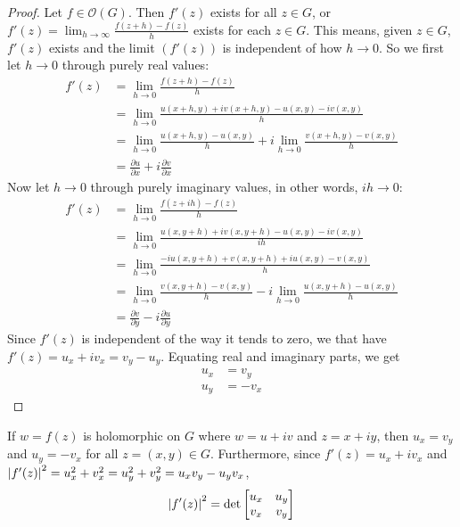 \documentclass[12pt]{article}
\begin{document}
\begin{proof} Let $f \in \mathcal{O}(G)$. Then $f'(z)$ exists for all $ z \in G$, or $f'(z) = \lim_{h\to\infty} \frac{f(z+h) - f(z)}{h}$ exists for each $z \in G$. This means, given $z \in G$, $f'(z)$ exists and the limit $(f'(z))$ is independent of how $h \to 0$. So we first let $h \to 0$ through purely real values: $$ \begin{aligned} 
f'(z) &= \lim_{h\to 0} \frac{f(z+h) - f(z)}{h} \\ &= \lim_{h\to 0} \frac{u(x+h,y) + iv(x+h,y) - u(x,y) - iv(x,y)}{h} \\ &= \lim_{h\to 0} \frac{u(x+h,y) - u(x,y)}{h} + i\lim_{h\to 0} \frac{v(x+h,y) - v(x,y)}{h} \\ &= \frac{\partial u}{\partial x} + i \frac{\partial v}{\partial x} \end{aligned} $$ 
Now let $h \to 0$ through purely imaginary values, in other words, $ih \to 0$: $$ \begin{aligned} f'(z) &= \lim_{h\to 0} \frac{f(z + ih) - f(z)}{h} \\ &= \lim_{h\to 0} \frac{u(x,y+h) + iv(x,y+h) - u(x,y) - iv(x,y)}{ih} \\ &= \lim_{h\to 0} \frac{-iu(x,y+h) + v(x,y+h) + iu(x,y) - v(x,y)}{h} \\ &= \lim_{h\to 0} \frac{v(x,y+h) - v(x,y)}{h} - i\lim_{h\to 0} \frac{u(x,y+h) - u(x,y)}{h} \\ &= \frac{\partial v}{\partial y} -i \frac{\partial u}{\partial y} \end{aligned} $$ 
Since $f'(z)$ is independent of the way it tends to zero, we that have $f'(z) = u_x + iv_x = v_y - u_y$. Equating real and imaginary parts, we get $$ \begin{aligned} u_x &= v_y\\ u_y &= -v_x \end{aligned} $$ \end{proof} 
\begin{theorem} If $w = f(z)$ is holomorphic on $G$ where $w = u + iv$ and $z = x + iy$, then $u_x = v_y$ and $u_y = -v_x$ for all $z = (x,y) \in G$. Furthermore, since $f'(z) = u_x + iv_x$ and $\abs{f'(z)}^2 = u_x^2 + v_x^2 = u_y^2 + v_y^2 = u_xv_y - u_yv_x$, $$ \abs{f'(z)}^2 = \det \begin{bmatrix} u_x & u_y \\ v_x & v_y \end{bmatrix}$$  \end{theorem} 
\end{document}
